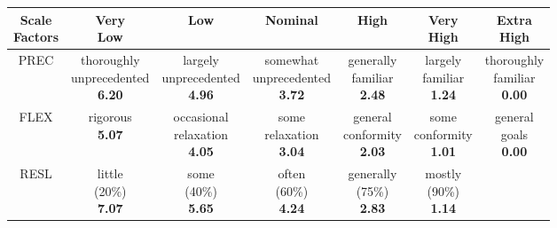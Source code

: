 {\scriptsize
\begin{longtable}{c|cccccc}
\toprule
\specialcell{Scale\\Factors}&\specialcell{Very\\Low}&Low&Nominal&High&\specialcell{Very\\High}&\specialcell{Extra\\High}\\
\midrule
PREC	&
\specialcell{thoroughly\\unprecedented\\\textbf{6.20}} & 
\specialcell{largely\\unprecedented\\\textbf{4.96}} & 
\specialcell{somewhat\\unprecedented\\\textbf{3.72}} & 
\specialcell{generally\\familiar\\\textbf{2.48}} & 
\specialcell{largely\\familiar\\\textbf{1.24}} & 
\specialcell{thoroughly\\familiar\\\textbf{0.00}} \\
\midrule
FLEX &
\specialcell{rigorous\\\textbf{5.07}} & 
\specialcell{occasional\\relaxation\\\textbf{4.05}} & 
\specialcell{some\\relaxation\\\textbf{3.04}} & 
\specialcell{general\\conformity\\\textbf{2.03}} & 
\specialcell{some\\conformity\\\textbf{1.01}} & 
\specialcell{general\\goals\\\textbf{0.00}} \\
\midrule
RESL &
\specialcell{little\\(20\%)\\\textbf{7.07}} & 
\specialcell{some\\(40\%)\\\textbf{5.65}} & 
\specialcell{often\\(60\%)\\\textbf{4.24}} & 
\specialcell{generally\\(75\%)\\\textbf{2.83}} & 
\specialcell{mostly\\(90\%)\\\textbf{1.14}} & 

\end{longtable}}
